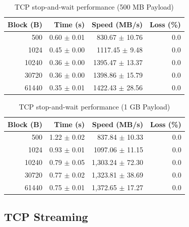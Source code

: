 \documentclass[12pt,a4paper]{article}
\begin{document}
\begin{table}[H]
    \centering
    \begin{tabular}{rrrr}
        \toprule
        \textbf{Block (B)} & \textbf{Time (s)} & \textbf{Speed (MB/s)} & \textbf{Loss (\%)} \\
        \midrule
        500 & 0.60 $\pm$ 0.01 & 830.67 $\pm$ 10.76 & 0.0 \\
        1024 & 0.45 $\pm$ 0.00 & 1117.45 $\pm$ 9.48 & 0.0 \\
        10240 & 0.36 $\pm$ 0.00 & 1395.47 $\pm$ 13.37 & 0.0 \\
        30720 & 0.36 $\pm$ 0.00 & 1398.86 $\pm$ 15.79 & 0.0 \\
        61440 & 0.35 $\pm$ 0.01 & 1422.43 $\pm$ 28.56 & 0.0 \\
        \bottomrule
    \end{tabular}
    \caption{TCP stop-and-wait performance (500 MB Payload)}
    \label{tab:tcp_sw_500mb}
\end{table}

\begin{table}[H]
    \centering
    \begin{tabular}{rrrr}
        \toprule
        \textbf{Block (B)} & \textbf{Time (s)} & \textbf{Speed (MB/s)} & \textbf{Loss (\%)} \\
        \midrule
        500 & 1.22 $\pm$ 0.02 & 837.84 $\pm$ 10.33 & 0.0 \\
        1024 & 0.93 $\pm$ 0.01 & 1097.06 $\pm$ 11.15 & 0.0 \\
        10240 & 0.79 $\pm$ 0.05 & 1,303.24 $\pm$ 72.30 & 0.0 \\
        30720 & 0.77 $\pm$ 0.02 & 1,323.81 $\pm$ 38.69 & 0.0 \\
        61440 & 0.75 $\pm$ 0.01 & 1,372.65 $\pm$ 17.27 & 0.0 \\
        \bottomrule
    \end{tabular}
    \caption{TCP stop-and-wait performance (1 GB Payload)}
    \label{tab:tcp_sw_1gb}
\end{table}

\subsection{TCP Streaming}
\end{document}
